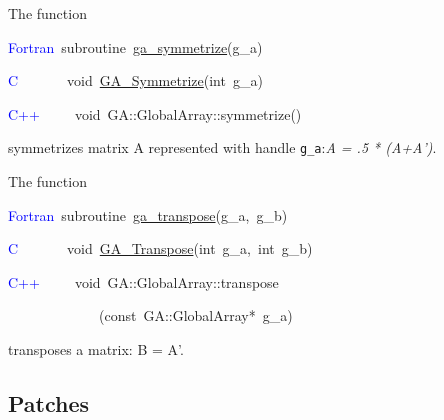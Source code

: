 The function
\begin{lyxcode}
\textcolor{blue}{Fortran}~subroutine~\href{http://www.emsl.pnl.gov/docs/global/ga_ops.html\#ga_symmetrize}{ga\_{}symmetrize}(g\_a)~

\textcolor{blue}{C}~~~~~~~void~\href{http://www.emsl.pnl.gov/docs/global/c_nga_ops.html\#ga_symmetrize}{GA\_{}Symmetrize}(int~g\_a)~

\textcolor{blue}{C++}~~~~~void~GA::GlobalArray::symmetrize()
\end{lyxcode}
symmetrizes matrix A represented with handle \texttt{g\_a}:\emph{A
= .5 {*} (A+A')}.

The function
\begin{lyxcode}
\textcolor{blue}{Fortran}~subroutine~\href{http://www.emsl.pnl.gov/docs/global/ga_ops.html\#ga_transpose}{ga\_{}transpose}(g\_a,~g\_b)~

\textcolor{blue}{C}~~~~~~~void~\href{http://www.emsl.pnl.gov/docs/global/c_nga_ops.html\#ga_transpose}{GA\_{}Transpose}(int~g\_a,~int~g\_b)~

\textcolor{blue}{C++}~~~~~void~GA::GlobalArray::transpose

~~~~~~~~~~~~~(const~GA::GlobalArray{*}~g\_a)
\end{lyxcode}
transposes a matrix: B = A'.


\subsection{Patches }

